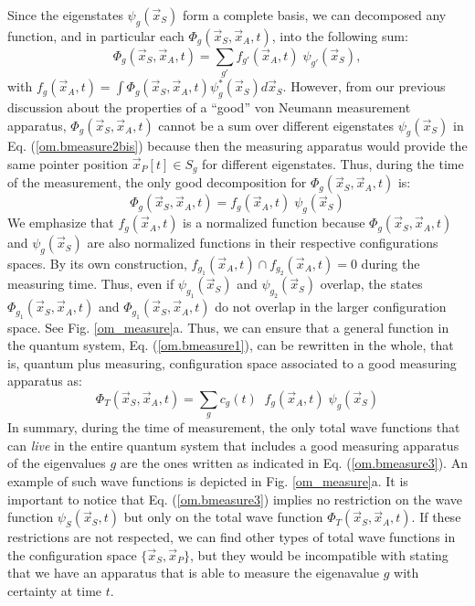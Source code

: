 \documentclass[onecolumn,nofootinbib, secnumarabic, amsmath, nobibnotes,11pt,aps,pra]{revtex4-1}
\newcommand{\fref}[1]{Fig. \ref{#1}}
\newcommand{\eref}[1]{Eq. (\ref{#1})}
\begin{document}
Since the eigenstates $\psi_g(\vec x_S)$ form a complete basis, we can decomposed any function, and in particular each $\Phi_g(\vec x_S,\vec x_A,t)$, into the following sum:
\begin{equation}
\Phi_g(\vec x_S,\vec x_A,t) = \sum_{g'} f_{g'}(\vec x_A,t) \; \psi_{g'}(\vec x_S)
\label{om.bmeasure2bis},
\end{equation}
with $ f_g(\vec x_A,t) = \int \Phi_g(\vec x_S,\vec x_A,t)
\psi^*_g(\vec x_S) d\vec x_S$. However, from our previous discussion
about the properties of a ``good'' von Neumann measurement
apparatus, $\Phi_g(\vec x_S,\vec x_A,t)$ cannot be a sum over
different eigenstates $\psi_g(\vec x_S)$ in \eref{om.bmeasure2bis}
because then the measuring apparatus would provide the same pointer
position $\vec x_P[t]\in S_{g}$ for different eigenstates. Thus, during the time of the measurement, the
only good decomposition for $\Phi_g(\vec x_S,\vec x_A,t)$ is:
\begin{equation}
\Phi_g(\vec x_S,\vec x_A,t) = f_g(\vec x_A,t) \; \psi_g(\vec x_S)
\label{om.bmeasure2}
\end{equation}
We emphasize that $ f_g(\vec x_A,t)$ is a normalized function because $\Phi_g(\vec x_S,\vec x_A,t)$ and $\psi_g(\vec x_S)$ are also normalized functions in their respective configurations spaces. By its own construction, $f_{g_1}(\vec x_A,t) \cap f_{g_2}(\vec x_A,t) = 0$ during the measuring time. Thus, even if $\psi_{g_1}(\vec x_S)$ and $\psi_{g_2}(\vec x_S)$ overlap, the states $\Phi_{g_1}(\vec x_S,\vec x_A,t)$ and $\Phi_{g_1}(\vec x_S,\vec x_A,t)$ do not overlap in the larger configuration space. See \fref{om_measure}a. Thus, we can ensure that a general function in the quantum system, \eref{om.bmeasure1}, can be rewritten in the whole, that is, quantum plus measuring, configuration space associated to a good measuring apparatus as:
\begin{equation}
\Phi_T(\vec x_S,\vec x_A,t) = \sum_{g} c_g(t) \;\; f_g(\vec x_A,t) \; \psi_g(\vec x_S)
\label{om.bmeasure3}
\end{equation}
In summary, during the time of measurement, the only total wave
functions that can \textit{live} in the entire quantum system that
includes a good measuring apparatus of the eigenvalues $g$ are the
ones written as indicated in \eref{om.bmeasure3}. An example of such
wave functions is depicted in \fref{om_measure}a. It is important to
notice that \eref{om.bmeasure3} implies no restriction on the wave
function $\psi_S(\vec x_S,t)$ but only on the total wave function
$\Phi_T(\vec x_S,\vec x_A,t)$. If these restrictions are not
respected, we can find other types of total wave functions in the
configuration space $\{\vec x_S,\vec x_P\}$, but they would be
incompatible with stating that we have an apparatus that is able to
measure the eigenavalue $g$ with certainty at time $t$.
\end{document}
